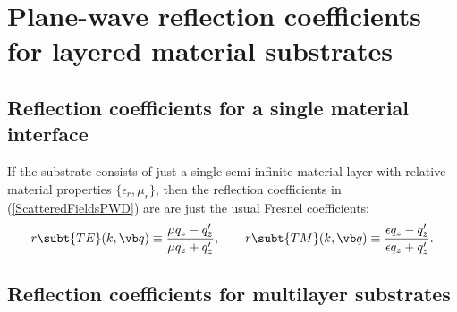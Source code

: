 \documentclass[letterpaper]{article}
\begin{document}
\section{Plane-wave reflection coefficients for layered material substrates}
\label{ReflectionCoefficientAppendix}

\subsection{Reflection coefficients for a single material interface}

If the substrate consists of just a single semi-infinite material layer
with relative material properties $\{\epsilon_r,\mu_r\}$, then
the reflection coefficients in (\ref{ScatteredFieldsPWD}) are
are just the usual Fresnel coefficients:
$$
   r\subt{TE}(k,\vb q) \equiv \frac{\mu q_z - q_z^\prime}{\mu q_z + q_z^\prime},
   \qquad
   r\subt{TM}(k,\vb q) \equiv \frac{\epsilon q_z - q_z^\prime}{\epsilon q_z + q_z^\prime}.
$$

\subsection{Reflection coefficients for multilayer substrates}
\end{document}
